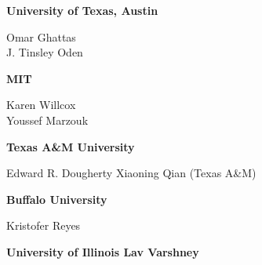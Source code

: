 \documentclass[11pt]{article}
\begin{document}
\bf{University of Texas, Austin}

Omar Ghattas\\
J. Tinsley Oden

\bf{MIT}

Karen Willcox\\
Youssef Marzouk


\bf{Texas A\&M University}

Edward R. Dougherty
Xiaoning Qian (Texas A\&M)

\bf{Buffalo University}

Kristofer Reyes

\bf{University of Illinois}
Lav Varshney 
\end{document}
